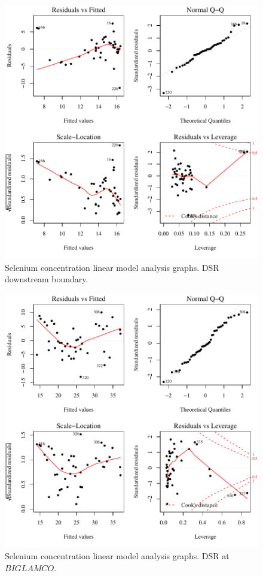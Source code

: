 \begin{figure}[htbp]
	\begin{center}
	\includegraphics[width=6in]{"Figures/Results_DSR/Conc Model lm-fit D106C"}
	\caption{Selenium concentration linear model analysis graphs.  DSR downstream boundary.}
	\end{center}
\end{figure}
\newpage

\begin{figure}[htbp]
	\begin{center}
	\includegraphics[width=6in]{"Figures/Results_DSR/Conc Model lm-fit BIG"}
	\caption{Selenium concentration linear model analysis graphs.  DSR at $BIGLAMCO$.}
	\end{center}
\end{figure}
\newpage

